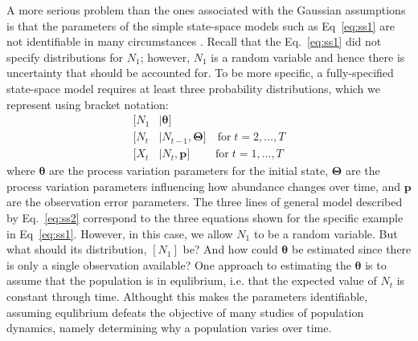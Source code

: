 \documentclass[12pt]{article}
\begin{document}
A more serious problem than the ones associated with the Gaussian
assumptions is that the parameters of the simple state-space models
such as Eq~\ref{eq:ss1} are not identifiable in many
circumstances \citep{polansky_etal:2009}. Recall that the
Eq.~\ref{eq:ss1} did not specify distributions for $N_1$; %
however, $N_1$ is a random variable and hence there is uncertainty
that should be accounted for.
To be more specific, a fully-specified state-space model requires at least
three probability distributions, which we represent
using bracket notation:
\begin{subequations}
  \label{eq:ss2}
  \begin{align}
    [N_1&|\bm{\theta}] \\ \label{eq:ss2b}
    [N_t&|N_{t-1},\bm{\Theta}] \quad \text{for} \; t=2,\hdots,T \\ \label{eq:ss2c}
    [X_t&|N_t,\bm{p}]  \qquad \; \text{for} \; t=1,\hdots,T
  \end{align}
\end{subequations}
where $\bm{\theta}$ are the process variation parameters for the
initial state, $\bm{\Theta}$ are the process variation parameters
influencing how abundance changes over time, and $\bm{p}$ are the
observation error parameters. The three lines of general model
described by Eq.~\ref{eq:ss2} correspond to the three equations shown
for the specific example in Eq~\ref{eq:ss1}.  However, in this case,
we allow $N_1$ to be a random variable. But what should its
distribution, $[N_1]$ be? And how could $\bm{\theta}$ be
estimated since there is only a single observation available?
One approach to estimating the $\bm{\theta}$ is to assume that the
population is in equlibrium, i.e. that the expected value of $N_t$ is
constant through time. Althought this makes the parameters
identifiable, assuming equlibrium defeats the objective of many
studies of population dynamics, namely determining why a population
varies over time.

\end{document}
